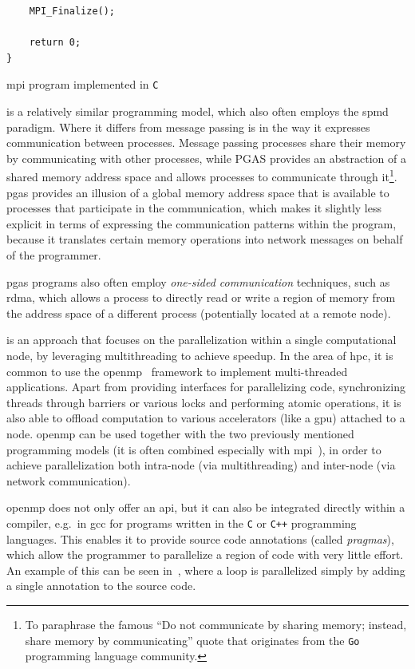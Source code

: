 \begin{description}[wide=0pt]
\begin{listing}[h]
\begin{verbatim}
	MPI_Finalize();

	return 0;
}
		  	\end{verbatim}
			\caption{\acrshort{mpi} program implemented in \texttt{C}}
			\label{lst:mpi-example}
		\end{listing}

	\item[\gls{pgas}~\cite{pgas}] is a relatively similar programming model, which also often employs the \gls{spmd}
		paradigm. Where it differs from message passing is in the way it expresses communication between
		processes. Message passing processes share their memory by communicating with other processes,
		while PGAS provides an abstraction of a shared memory address space and allows processes to
		communicate through it\footnote{To paraphrase the famous ``Do not communicate by sharing memory; instead, share memory by communicating'' quote that originates from the \texttt{Go} programming
		language community.}. \gls{pgas} provides an illusion of a
		global memory address space that is available to processes that participate in the communication,
		which makes it slightly less explicit in terms of expressing the communication patterns within the
		program, because it translates certain memory operations into network messages on behalf of the
		programmer.

		\gls{pgas} programs also often employ \emph{one-sided communication} techniques, such
		as \gls{rdma}, which allows a process to directly read or write a region of memory from
		the address space of a different process (potentially located at a remote node).

	\item[Shared-memory multiprocessing] is an approach that focuses on the parallelization within a single computational node, by
		leveraging multithreading to achieve speedup. In the area of \gls{hpc}, it is common
		to use the \gls{openmp}~\cite{openmp} framework to implement multi-threaded
		applications. Apart from providing interfaces for parallelizing code, synchronizing threads through
		barriers or various locks and performing atomic operations, it is also able to offload computation
		to various accelerators (like a \gls{gpu}) attached to a node. \gls{openmp}
		can be used together with the two previously mentioned programming models (it is often combined
		especially with \gls{mpi}~\cite{hybrid_openmp_mpi}), in order to achieve parallelization
		both intra-node (via multithreading) and inter-node (via network communication).

		\gls{openmp} does not only offer an \gls{api}, but it can also be
		integrated directly within a compiler, e.g.\ in \gls{gcc} for programs written in the
		\texttt{C} or \texttt{C++} programming languages. This enables it to provide
		source code annotations (called \emph{pragmas}), which allow the programmer to parallelize
		a region of code with very little effort. An example of this can be seen in~,
		where a loop is parallelized simply by adding a single annotation to the source code.


\end{description}
